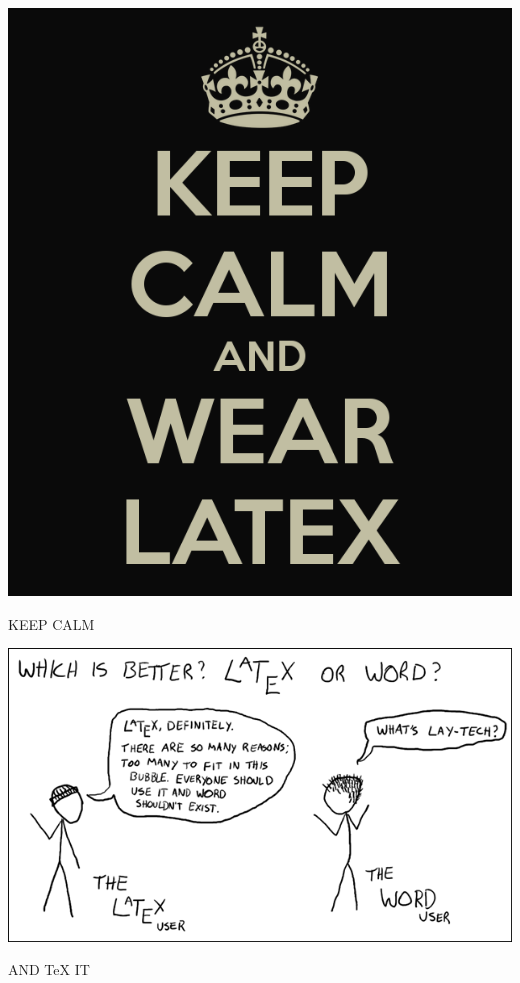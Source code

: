 \documentclass[newPxFont]{beamer}
\begin{document}
\begingroup
{}
\begin{frame}[plain]
\centering \includegraphics[width=0.7\linewidth]{keep-calm.png}
\end{frame}
\endgroup 



\begin{frame}
\centering \alert{\LARGE{ KEEP CALM }}

\vspace{1cm}
\centering \includegraphics[width=0.8\linewidth]{joke_2.png}
\vspace{1cm} 

\centering \alert{\LARGE{ AND \TeX{ } IT }}
\end{frame}
\end{document}
